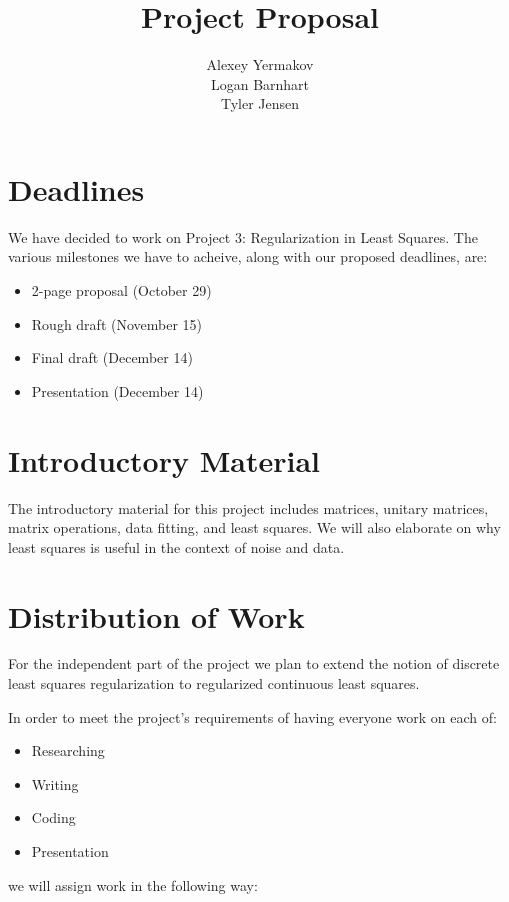\documentclass{article}
\title{Project Proposal}
\author{Alexey Yermakov\\Logan Barnhart\\Tyler Jensen}
\begin{document}
    \maketitle

    \section{Deadlines}

    We have decided to work on Project 3: Regularization in Least Squares. The various milestones we have to acheive, along with our proposed deadlines, are:

    \begin{itemize}
        \item 2-page proposal (October 29)
        \item Rough draft (November 15)
        \item Final draft (December 14)
        \item Presentation (December 14)
    \end{itemize}

    \section{Introductory Material}

    The introductory material for this project includes matrices, unitary matrices, matrix operations, data fitting, and least squares. We will also elaborate on why least squares is useful in the context of noise and data.

    \section{Distribution of Work}

    For the independent part of the project we plan to extend the notion of discrete least squares regularization to regularized continuous least squares.

    In order to meet the project's requirements of having everyone work on each of:

    \begin{itemize}
        \item Researching
        \item Writing
        \item Coding
        \item Presentation
    \end{itemize}

    we will assign work in the following way:
\end{document}
